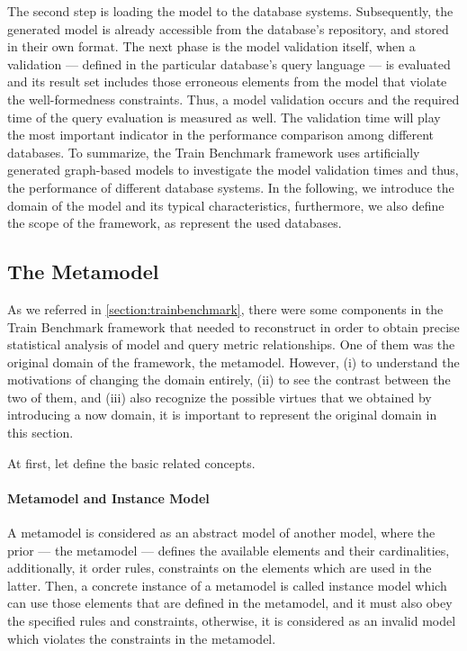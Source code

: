 The second step is loading the model to the database systems. Subsequently, the generated model is already accessible from the database's repository, and stored in their own format. The next phase is the model validation itself, when a validation --- defined in the particular database's query language --- is evaluated and its result set includes those erroneous elements from the model that violate the well-formedness constraints. Thus, a model validation occurs and the required time of the query evaluation is measured as well. The validation time will play the most important indicator in the performance comparison among different databases.
To summarize, the Train Benchmark framework uses artificially generated graph-based models to investigate the model validation times and thus, the performance of different database systems. In the following, we introduce the domain of the model and its typical characteristics, furthermore, we also define the scope of the framework, as represent the used databases.

\subsection{The Metamodel} \label{section:metamodel}

As we referred in \ref{section:trainbenchmark}, there were some components in the Train Benchmark framework that needed to reconstruct in order to obtain precise statistical analysis of model and query metric relationships. One of them was the original domain of the framework, the metamodel. However, (i) to understand the motivations of changing the domain entirely, (ii) to see the contrast between the two of them, and (iii) also recognize the possible virtues that we obtained by introducing a now domain, it is important to represent the original domain in this section.

At first, let define the basic related concepts.

\paragraph{Metamodel and Instance Model}

A metamodel is considered as an abstract model of another model, where the prior --- the metamodel --- defines the available elements and their cardinalities, additionally, it order rules, constraints on the elements which are used in the latter. Then, a concrete instance of a metamodel is called instance model which can use those elements that are defined in the metamodel, and it must also obey the specified rules and constraints, otherwise, it is considered as an invalid model which violates the constraints in the metamodel.

